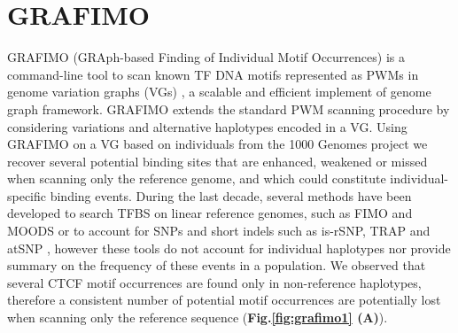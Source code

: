 \documentclass[a4paper, titlepage, openright]{book}
\begin{document}
\section{GRAFIMO}
GRAFIMO (GRAph-based Finding of Individual Motif Occurrences) \citep{tognon2021grafimo} is a command-line tool to scan known TF DNA motifs represented as PWMs in genome variation graphs (VGs) \citep{garrison2018variation}, a scalable and efficient implement of genome graph framework. GRAFIMO extends the standard PWM scanning procedure by considering variations and alternative haplotypes encoded in a VG. Using GRAFIMO on a VG based on individuals from the 1000 Genomes project \citep{siva20081000} we recover several potential binding sites that are enhanced, weakened or missed when scanning only the reference genome, and which could constitute individual-specific binding events. During the last decade, several methods have been developed to search TFBS on linear reference genomes, such as FIMO \citep{grant2011fimo} and MOODS \citep{korhonen2009moods} or to account for SNPs and short indels such as is-rSNP, TRAP and atSNP \citep{macintyre2010rsnp,thomas2011transcription,zuo2015atsnp}, however these tools do not account for individual haplotypes nor provide summary on the frequency of these events in a population. We observed that several CTCF motif occurrences are found only in non-reference haplotypes, therefore a consistent number of potential motif occurrences are potentially lost when scanning only the reference sequence (\textbf{Fig.\ref{fig:grafimo1} (A)}). 
\end{document}
